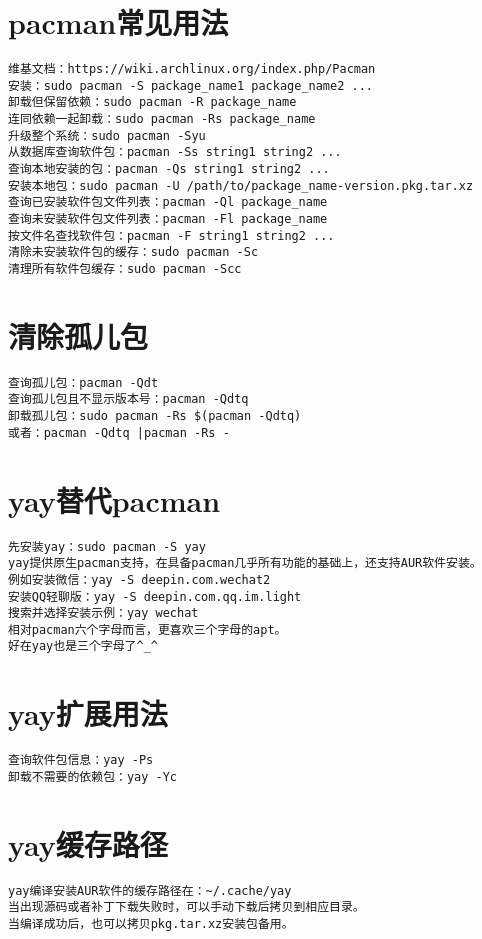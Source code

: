 \documentclass[a4paper,fontset=fandol,zihao=-4,linespread=1.2]{ctexbook}
\begin{document}
\section{pacman常见用法}
\begin{lstlisting}
维基文档：https://wiki.archlinux.org/index.php/Pacman
安装：sudo pacman -S package_name1 package_name2 ...
卸载但保留依赖：sudo pacman -R package_name
连同依赖一起卸载：sudo pacman -Rs package_name
升级整个系统：sudo pacman -Syu
从数据库查询软件包：pacman -Ss string1 string2 ...
查询本地安装的包：pacman -Qs string1 string2 ...
安装本地包：sudo pacman -U /path/to/package_name-version.pkg.tar.xz
查询已安装软件包文件列表：pacman -Ql package_name
查询未安装软件包文件列表：pacman -Fl package_name
按文件名查找软件包：pacman -F string1 string2 ...
清除未安装软件包的缓存：sudo pacman -Sc
清理所有软件包缓存：sudo pacman -Scc
\end{lstlisting}

\section{清除孤儿包}
\begin{lstlisting}
查询孤儿包：pacman -Qdt
查询孤儿包且不显示版本号：pacman -Qdtq
卸载孤儿包：sudo pacman -Rs $(pacman -Qdtq)
或者：pacman -Qdtq |pacman -Rs -
\end{lstlisting}

\section{yay替代pacman}
\begin{lstlisting}
先安装yay：sudo pacman -S yay
yay提供原生pacman支持，在具备pacman几乎所有功能的基础上，还支持AUR软件安装。
例如安装微信：yay -S deepin.com.wechat2
安装QQ轻聊版：yay -S deepin.com.qq.im.light
搜索并选择安装示例：yay wechat
相对pacman六个字母而言，更喜欢三个字母的apt。
好在yay也是三个字母了^_^
\end{lstlisting}

\section{yay扩展用法}
\begin{lstlisting}
查询软件包信息：yay -Ps
卸载不需要的依赖包：yay -Yc
\end{lstlisting}

\section{yay缓存路径}
\begin{lstlisting}
yay编译安装AUR软件的缓存路径在：~/.cache/yay
当出现源码或者补丁下载失败时，可以手动下载后拷贝到相应目录。
当编译成功后，也可以拷贝pkg.tar.xz安装包备用。
\end{lstlisting}
\end{document}
